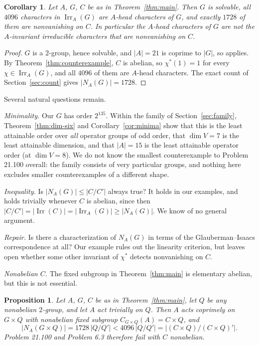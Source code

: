 \documentclass[11pt,a4paper,reqno]{amsart}
\newtheorem{proposition}[theorem]{Proposition}
\newtheorem{corollary}[theorem]{Corollary}
\theoremstyle{definition}
\theoremstyle{remark}
\newcommand{\Irr}{\operatorname{Irr}}
\begin{document}
\begin{corollary}\label{cor:head}
Let $A$, $G$, $C$ be as in Theorem~\ref{thm:main}.  Then $G$ is
solvable, all $4096$ characters in $\Irr_A(G)$ are $A$-head characters
of $G$, and exactly $1728$ of them are nonvanishing on $C$.  In
particular the $A$-head characters of $G$ are not the $A$-invariant
irreducible characters that are nonvanishing on $C$.
\end{corollary}

\begin{proof}
$G$ is a $2$-group, hence solvable, and $|A|=21$ is coprime to $|G|$, so
\cite[Theorem 7.1]{isaacs-carter} applies.  By
Theorem~\ref{thm:counterexample}, $C$ is abelian, so $\chi^*(1)=1$ for
every $\chi\in\Irr_A(G)$, and all $4096$ of them are $A$-head characters.
The exact count of Section~\ref{sec:count} gives $|N_A(G)|=1728$.
\end{proof}

Several natural questions remain.

\emph{Minimality.} Our $G$ has order $2^{135}$.  Within the family of
Section~\ref{sec:family}, Theorem~\ref{thm:dim-six} and
Corollary~\ref{cor:minima} show that this is the least attainable
order over \emph{all} operator groups of odd order, that $\dim V=7$ is
the least attainable dimension, and that $|A|=15$ is the least
attainable operator order (at $\dim V=8$).  We do not know the
smallest counterexample to Problem 21.100 overall: the family consists
of very particular groups, and nothing here excludes smaller
counterexamples of a different shape.

\emph{Inequality.} Is $|N_A(G)|\le|C/C'|$ always true?  It holds in our
examples, and holds trivially whenever $C$ is abelian, since then
$|C/C'|=|\Irr(C)|=|\Irr_A(G)|\ge|N_A(G)|$.  We know of no general
argument.

\emph{Repair.} Is there a characterization of $N_A(G)$ in terms of the
Glauberman--Isaacs correspondence at all?  Our example rules out the
linearity criterion, but leaves open whether some other invariant of
$\chi^*$ detects nonvanishing on $C$.

\emph{Nonabelian $C$.} The fixed subgroup in Theorem~\ref{thm:main} is
elementary abelian, but this is not essential.

\begin{proposition}\label{prop:nonabelian-C}
Let $A$, $G$, $C$ be as in Theorem~\ref{thm:main}, let $Q$ be any
nonabelian $2$-group, and let $A$ act trivially on $Q$.  Then $A$ acts
coprimely on $G\times Q$ with nonabelian fixed subgroup
$C_{G\times Q}(A)=C\times Q$, and
\[
 |N_A(G\times Q)|=1728\,|Q/Q'|
 <4096\,|Q/Q'|=|(C\times Q)/(C\times Q)'| .
\]
Problem 21.100 and Problem 6.3 therefore fail with $C$ nonabelian.
\end{proposition}
\end{document}
